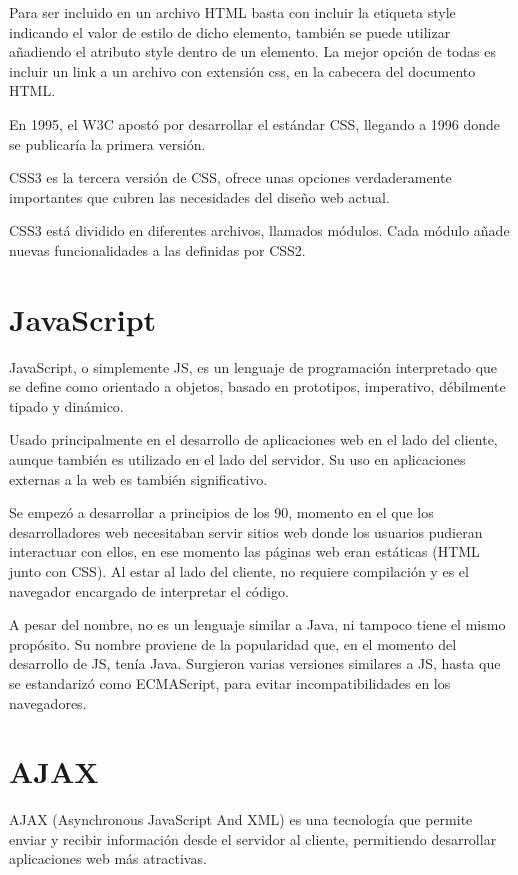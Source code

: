 Para ser incluido en un archivo HTML basta con incluir la etiqueta style indicando el valor de estilo de dicho elemento, también se puede utilizar añadiendo el atributo style dentro de un elemento. La mejor opción de todas es incluir un link a un archivo con extensión css, en la cabecera del documento HTML.


En 1995, el W3C apostó por desarrollar el estándar CSS, llegando a 1996 donde se publicaría la primera versión. 


CSS3 es la tercera versión de CSS, ofrece unas opciones verdaderamente importantes que cubren las necesidades del diseño web actual.


CSS3 está dividido en diferentes archivos, llamados módulos. Cada módulo añade nuevas funcionalidades a las definidas por CSS2. 

\section{JavaScript} 
\label{sec:javascript}


JavaScript, o simplemente JS, es un lenguaje de programación interpretado que se define como orientado a objetos, basado en prototipos, imperativo, débilmente tipado y dinámico. 


Usado principalmente en el desarrollo de aplicaciones web en el lado del cliente, aunque también es utilizado en el lado del servidor. Su uso en aplicaciones externas a la web es también significativo.


Se empezó a desarrollar a principios de los 90, momento en el que los desarrolladores web necesitaban servir sitios web donde los usuarios pudieran interactuar con ellos, en ese momento las páginas web eran estáticas (HTML junto con CSS). Al estar al lado del cliente, no requiere compilación y es el navegador encargado de interpretar el código.


A pesar del nombre, no es un lenguaje similar a Java, ni tampoco tiene el mismo propósito. Su nombre proviene de la popularidad que, en el momento del desarrollo de JS, tenía Java. Surgieron varias versiones similares a JS, hasta que se estandarizó como ECMAScript, para evitar incompatibilidades en los navegadores.


\section{AJAX} 
\label{sec:ajax}


AJAX (Asynchronous JavaScript And XML) es una tecnología que permite enviar y recibir información desde el servidor al cliente, permitiendo desarrollar aplicaciones web más atractivas.


